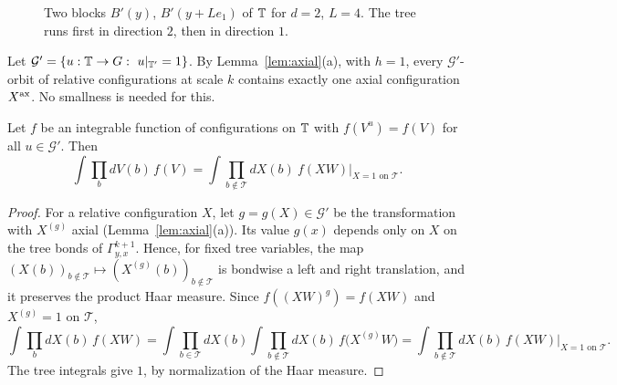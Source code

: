 \begin{figure}[t]
\centering
{}
\caption{Two blocks $B'(y)$, $B'(y+Le_1)$ of $\mathbb T$ for $d=2$, $L=4$. The tree runs first in direction $2$, then in direction $1$.}
\label{fig:tree}
\end{figure}

Let $\mathcal G'=\{u:\T\to G:\ u|_{\T'}=1\}$. By Lemma~\ref{lem:axial}(a), with $h=1$, every $\mathcal G'$-orbit of relative configurations at scale $k$ contains exactly one axial configuration $X^{\rm ax}$. No smallness is needed for this.

\begin{lemma}\label{lem:FP}
Let $f$ be an integrable function of configurations on $\mathbb T$ with $f(V^u)=f(V)$ for all $u\in\mathcal G'$. Then
\[
\int\prod_bdV(b)\,f(V)=\int\prod_{b\notin\mathcal T}dX(b)\ f(XW)\Big|_{X=1\text{ on }\mathcal T}.
\]
\end{lemma}

\begin{proof}
For a relative configuration $X$, let $g=g(X)\in\mathcal G'$ be the transformation with $X^{(g)}$ axial (Lemma~\ref{lem:axial}(a)). Its value $g(x)$ depends only on $X$ on the tree bonds of $\Gamma^{k+1}_{y,x}$. Hence, for fixed tree variables, the map $(X(b))_{b\notin\mathcal T}\mapsto(X^{(g)}(b))_{b\notin\mathcal T}$ is bondwise a left and right translation, and it preserves the product Haar measure. Since $f((XW)^g)=f(XW)$ and $X^{(g)}=1$ on $\mathcal T$,
\[
\int\prod_bdX(b)\,f(XW)=\int\prod_{b\in\mathcal T}dX(b)\int\prod_{b\notin\mathcal T}dX(b)\,f\big(X^{(g)}W\big)=\int\prod_{b\notin\mathcal T}dX(b)\,f(XW)\Big|_{X=1\text{ on }\mathcal T}.
\]
The tree integrals give $1$, by normalization of the Haar measure.
\end{proof}


